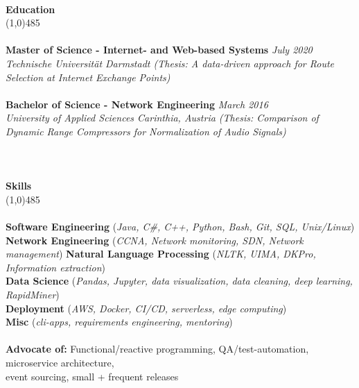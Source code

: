 \documentclass[9pt]{extarticle}
\newcommand\tab[1][1cm]{\hspace*{#1}}
\newcommand\smallspace[1][0.23cm]{\hspace*{#1}}
\newcommand\negativespace[1][-0.12cm]{\hspace*{#1}}
\begin{document}
\noindent %
\\
\vspace*{-6pt}
{\negativespace \Large \bf Education}\\
\line(1,0){485}\\
\\
\noindent
{\bf Master of Science - Internet- and Web-based Systems} \hfill \textit{July 2020} \\ 
\textit{Technische Universität Darmstadt (Thesis: A data-driven approach for Route Selection at Internet Exchange Points)}\\\\
\noindent
{\bf Bachelor of Science - Network Engineering} \hfill \textit{March 2016} \\
\textit{University of Applied Sciences Carinthia, Austria (Thesis: Comparison of Dynamic Range Compressors for Normalization of Audio Signals)}\\
\\
\\\\
\vspace*{-6pt}
{\negativespace \Large \bf Skills}\\
\line(1,0){485}\\
\\
\noindent
{\bf Software Engineering }(\textit{Java, C\#, C++, Python, Bash, Git, SQL, Unix/Linux})
{\bf Network Engineering }(\textit{CCNA, Network monitoring, SDN, Network management})
{\bf Natural Language Processing }(\textit{NLTK, UIMA, DKPro, Information extraction}) \\
{\bf Data Science }(\textit{Pandas, Jupyter, data visualization, data cleaning, deep learning, RapidMiner}) \\
{\bf Deployment }(\textit{AWS, Docker, CI/CD, serverless, edge computing}) \\
{\bf Misc }(\textit{cli-apps, requirements engineering, mentoring}) \\\\
\noindent
{\bf Advocate of:} Functional/reactive programming, QA/test-automation, microservice architecture,\\ 
 \tab \tab \smallspace event sourcing, small + frequent releases
\end{document}
